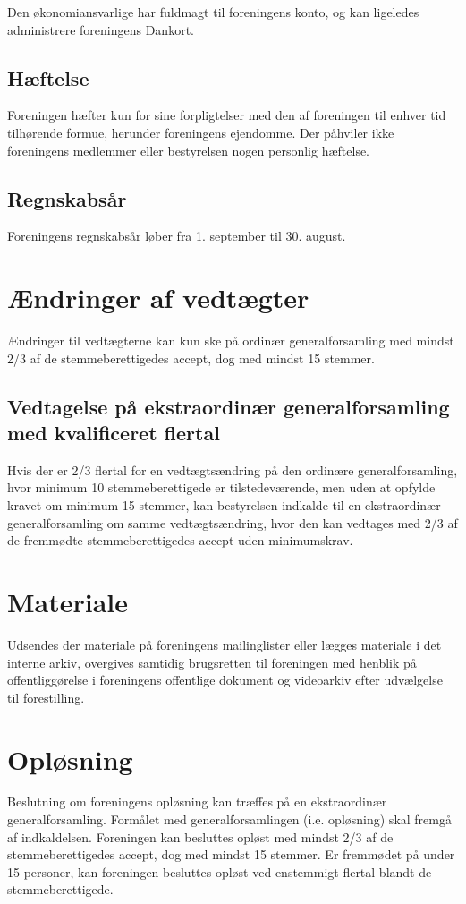 \documentclass[a4paper,11pt,danish]{article}
\begin{document}
\noindent Den økonomiansvarlige har fuldmagt til foreningens konto, og kan ligeledes administrere foreningens Dankort. 

\subsection{Hæftelse}
Foreningen hæfter kun for sine forpligtelser med den af foreningen til enhver
tid tilhørende formue, herunder foreningens ejendomme. Der påhviler ikke
foreningens medlemmer eller bestyrelsen nogen personlig hæftelse.

\subsection{Regnskabsår}
Foreningens regnskabsår løber fra 1. september til 30. august. 

\section{Ændringer af vedtægter}
Ændringer til vedtægterne kan kun ske på ordinær generalforsamling med mindst
2/3 af de stemmeberettigedes accept, dog med mindst 15 stemmer.

\subsection{Vedtagelse på ekstraordinær generalforsamling med kvalificeret
flertal}
Hvis der er 2/3 flertal for en vedtægtsændring på den ordinære
generalforsamling, hvor minimum 10 stemmeberettigede er tilstedeværende, men
uden at opfylde kravet om minimum 15 stemmer, kan bestyrelsen indkalde til en
ekstraordinær generalforsamling om samme vedtægtsændring, hvor den kan
vedtages med 2/3 af de fremmødte stemmeberettigedes accept uden minimumskrav.

\section{Materiale}
Udsendes der materiale på foreningens mailinglister eller lægges materiale i
det interne arkiv, overgives samtidig brugsretten til foreningen med henblik på
offentliggørelse i foreningens offentlige dokument og videoarkiv efter
udvælgelse til forestilling.

\section{Opløsning}
Beslutning om foreningens opløsning kan træffes på en ekstraordinær
generalforsamling. Formålet med generalforsamlingen (i.e. opløsning) skal
fremgå af indkaldelsen. Foreningen kan besluttes opløst med mindst 2/3 af de
stemmeberettigedes accept, dog med mindst 15 stemmer. Er fremmødet på under 15
personer, kan foreningen besluttes opløst ved enstemmigt flertal blandt de
stemmeberettigede.\\
\end{document}
